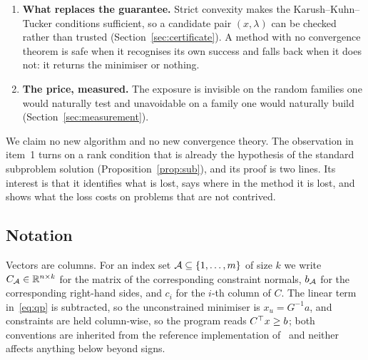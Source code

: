 \begin{enumerate}
\item \textbf{What replaces the guarantee.} Strict convexity makes the
Karush--Kuhn--Tucker conditions sufficient, so a candidate pair $(x,\lambda)$ can
be checked rather than trusted (Section~\ref{sec:certificate}). A method with no
convergence theorem is safe when it recognises its own success and falls back when
it does not: it returns the minimiser or nothing.

\item \textbf{The price, measured.} The exposure is invisible on the random
families one would naturally test and unavoidable on a family one would
naturally build (Section~\ref{sec:measurement}).
\end{enumerate}

We claim no new algorithm and no new convergence theory. The observation in
item~1 turns on a rank condition that is already the hypothesis of the standard
subproblem solution (Proposition~\ref{prop:sub}), and its proof is two lines. Its
interest is that it identifies what is lost, says where in the method it is lost,
and shows what the loss costs on problems that are not contrived.

\subsection{Notation}

Vectors are columns. For an index set $\mathcal{A} \subseteq \{1,\dots,m\}$ of size
$k$ we write $C_{\mathcal{A}} \in \mathbb{R}^{n \times k}$ for the matrix of the corresponding
constraint normals, $b_{\mathcal{A}}$ for the corresponding right-hand sides, and $c_i$
for the $i$-th column of $C$. The linear term in~\eqref{eq:qp} is subtracted, so
the unconstrained minimiser is $x_u = G^{-1}a$, and constraints are held
column-wise, so the program reads $C^{\top} x \ge b$; both conventions are inherited
from the reference implementation of~\cite{goldfarb1983} and neither affects
anything below beyond signs.
